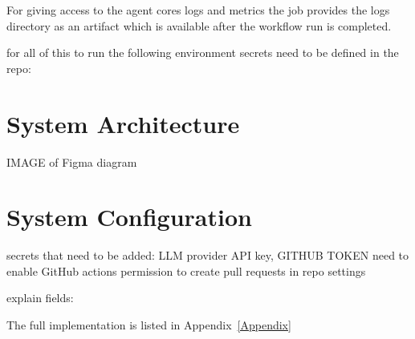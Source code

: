 For giving access to the agent cores logs and metrics the job provides the logs directory as an artifact which is available after the workflow run is completed.


for all of this to run the following environment secrets need to be defined in the repo:


\section{System Architecture}

IMAGE of Figma diagram



\section{System Configuration}




secrets that need to be added:
LLM provider API key, GITHUB TOKEN
need to enable GitHub actions permission to create pull requests in repo settings

explain fields:

The full implementation is listed in Appendix~\ref{Appendix}